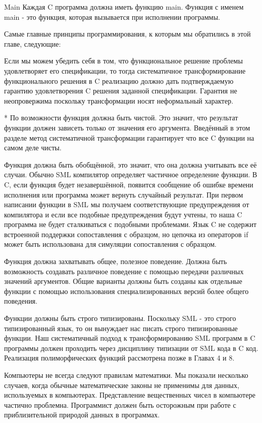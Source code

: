 Main Каждая C программа должна иметь функцию main. Функция с именем main - это функция, которая вызывается при исполнении программы.

Самые главные принципы программирования, к которым мы обратились в этой главе, следующие:

Если мы можем убедить себя в том, что функциональное решение проблемы удовлетворяет его спецификации, то тогда систематичное трансформирование функционального решения в C реализацию должно дать подтверждаемую гарантию удовлетворения C решения заданной спецификации. Гарантия не неопровержима поскольку трансформации носят неформальный характер.

* По возможности функция должна быть чистой. Это значит, что результат функции должен зависеть только от значения его аргумента. Введённый в этом разделе метод систематичной трансформации гарантирует что все C функции на самом деле чисты.

Функция должна быть обобщённой, это значит, что она должна учитывать все её случаи. Обычно SML компилятор определяет частичное определение функции. В C, если функция будет незавершённой, появится сообщение об ошибке времени исполнения или программа может вернуть случайный результат. При первом написании функции в SML мы получаем соответствующие предупреждения от компилятора и если все подобные предупреждения будут учтены, то наша C программа не будет сталкиваться с подобными проблемами. Язык C не содержит встроенной поддержки сопоставления с образцом, но цепочка из операторов if может быть использована для симуляции сопоставления с образцом.

Функция должна захватывать общее, полезное поведение. Должна быть возможность создавать различное поведение с помощью передачи различных значений аргументов. Общие варианты должны быть созданы как отдельные функции с помощью использования специализированных версий более общего поведения.

Функции должны быть строго типизированы. Поскольку SML - это строго типизированный язык, то он вынуждает нас писать строго типизированные функции. Наш систематичный подход к трансформированию SML программ в C программы должен проходить через дисциплину типизации от SML кода в C код. Реализация полиморфических функций рассмотрена позже в Главах 4 и 8.

Компьютеры не всегда следуют правилам математики. Мы показали несколько случаев, когда обычные математические законы не применимы для данных, используемых в компьютерах. Представление вещественных чисел в компьютере частично проблемна. Программист должен быть осторожным при работе с приблизительной природой данных в программах.

